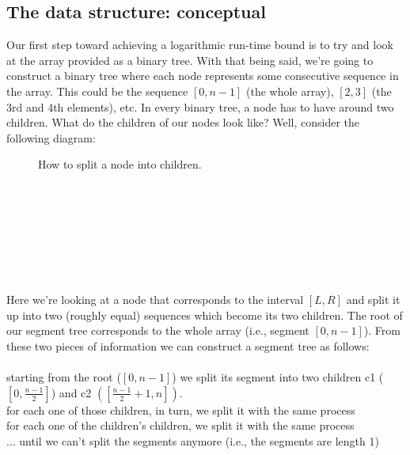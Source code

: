 \documentclass[11pt]{article}
\theoremstyle{plain}
\theoremstyle{definition}
\begin{document}
\subsection{The data structure: conceptual}
Our first step toward achieving a logarithmic run-time bound is to try and look at the array provided as a binary tree. With that being said, we're going to construct a binary tree where each node represents some consecutive sequence in the array. This could be the sequence $[0, n-1]$ (the whole array), $[2, 3]$ (the 3rd and 4th elements), etc. In every binary tree, a node has to have around two children. What do the children of our nodes look like? Well, consider the following diagram:
\begin{figure}[h]
    \caption{How to split a node into children.}
\centering

{
}
\end{figure}
\\ \\ \\ \\ \\ \\ \\
Here we're looking at a node that corresponds to the interval $[L, R]$ and split it up into two (roughly equal) sequences which become its two children. The root of our segment tree corresponds to the whole array (i.e., segment $[0, n-1]$). From these two pieces of information we can construct a segment tree as follows:\\
\\starting from the root ($[0, n-1]$) we split its segment into two children c1 ($[0, \frac{n-1}{2}]$) and c2 $([\frac{n-1}{2}+1, n])$.
\\ \indent for each one of those children, in turn, we split it with the same process
\\ \indent \indent for each one of the children's children, we split it with the same process
\\ \indent \indent \indent ... until we can't split the segments anymore (i.e., the segments are length 1)
\\\\
\end{document}
